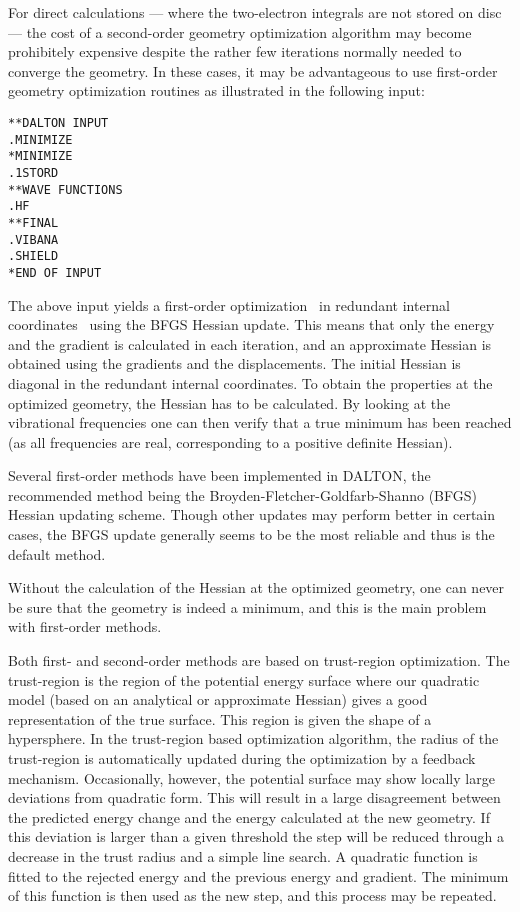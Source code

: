 For direct calculations --- where the
two-electron integrals are not 
stored on disc --- the cost of a second-order geometry optimization
algorithm may become prohibitely expensive despite the rather few
iterations normally needed to converge the geometry. In these cases,
it may be advantageous to use first-order geometry
optimization
routines as illustrated in the following input:

\begin{verbatim}
**DALTON INPUT
.MINIMIZE
*MINIMIZE
.1STORD
**WAVE FUNCTIONS
.HF
**FINAL
.VIBANA
.SHIELD
*END OF INPUT
\end{verbatim}

The above input yields a first-order
optimization~\cite{Fletcher} in redundant internal
coordinates~\cite{gfxfzpwtppjacs114,ppgfjcp96,vbth} using the BFGS 
Hessian update. This means that 
only the energy and the gradient is calculated in each iteration, and
an approximate Hessian is obtained using the gradients and the
displacements. The initial Hessian is diagonal in the redundant
internal coordinates. To obtain the properties at the optimized
geometry, the Hessian has to be calculated. By looking at the
vibrational frequencies one can then verify that a true minimum has
been reached (as all frequencies are real, corresponding to a positive
definite Hessian).

Several first-order methods have been implemented in DALTON, the
recommended method being the Broyden-Fletcher-Goldfarb-Shanno (BFGS)
Hessian updating scheme. Though other
updates may perform better in 
certain cases, the BFGS update generally seems to be the most
reliable and thus is the default method.

Without the calculation of the Hessian at the optimized geometry, one
can never be sure that the geometry is indeed a minimum, and this is the
main problem with first-order methods. 

Both first- and second-order methods are based on
trust-region
optimization. The trust-region is the region of the potential energy
surface where our quadratic model (based on an analytical or
approximate Hessian) gives a good representation of the true
surface. This region is given the shape of a
hypersphere. In the trust-region based optimization algorithm, the
radius of the trust-region is
automatically updated during the optimization by a feedback mechanism.
Occasionally, however, the potential surface may show locally large
deviations from quadratic form. This will result in a large
disagreement between the predicted energy change and the energy
calculated at the new geometry. If this deviation is larger than a
given threshold the step will be reduced through a decrease in the
trust radius and a simple line search. A quadratic function is fitted
to the rejected energy and the previous energy and gradient. The
minimum of this function is then used as the new step, and this
process may be repeated.

